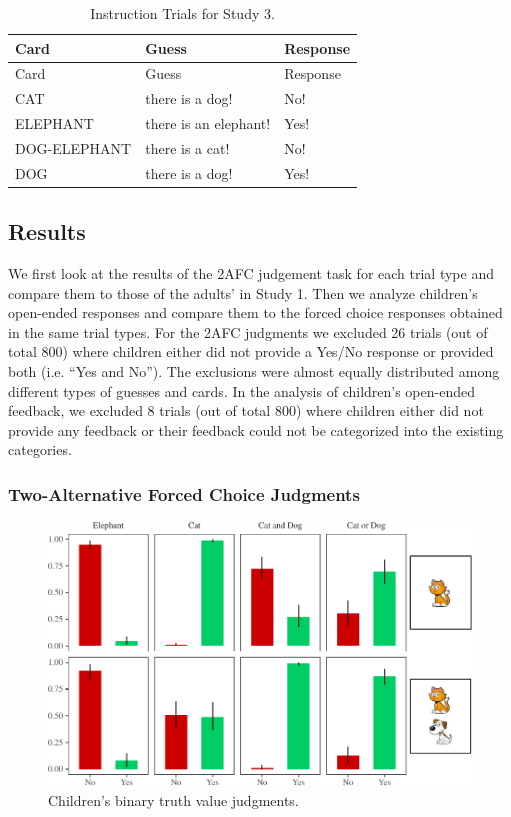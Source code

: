 \documentclass[floatsintext,man]{apa6}
\theoremstyle{definition}
\theoremstyle{definition}
\theoremstyle{definition}
\theoremstyle{remark}
\begin{document}
\begin{longtable}[]{@{}lll@{}}
\caption{\label{tab:instructionStudy3} Instruction Trials for Study
3.}\tabularnewline
\toprule
Card & Guess & Response\tabularnewline
\midrule
\endfirsthead
\toprule
Card & Guess & Response\tabularnewline
\midrule
\endhead
CAT & there is a dog! & No!\tabularnewline
ELEPHANT & there is an elephant! & Yes!\tabularnewline
DOG-ELEPHANT & there is a cat! & No!\tabularnewline
DOG & there is a dog! & Yes!\tabularnewline
\bottomrule
\end{longtable}

\subsection{Results}\label{results-2}

We first look at the results of the 2AFC judgement task for each trial
type and compare them to those of the adults' in Study 1. Then we
analyze children's open-ended responses and compare them to the forced
choice responses obtained in the same trial types. For the 2AFC
judgments we excluded 26 trials (out of total 800) where children either
did not provide a Yes/No response or provided both (i.e. \enquote{Yes
and No}). The exclusions were almost equally distributed among different
types of guesses and cards. In the analysis of children's open-ended
feedback, we excluded 8 trials (out of total 800) where children either
did not provide any feedback or their feedback could not be categorized
into the existing categories.

\subsubsection{Two-Alternative Forced Choice
Judgments}\label{two-alternative-forced-choice-judgments}

\begin{figure}
\centering
\includegraphics{figs/Study3tvjtPlot-1.pdf}
\caption{\label{fig:Study3tvjtPlot}Children's binary truth value judgments.}
\end{figure}
\end{document}
